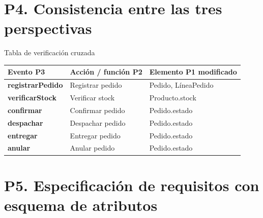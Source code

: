 \documentclass[11pt,a4paper]{article}
\begin{document}
\section*{P4. Consistencia entre las tres perspectivas}
\begin{taskbox}{Tabla de verificación cruzada}
\small
\begin{tabularx}{\textwidth}{>{\bfseries}p{2.8cm} X X}
\toprule
\textcolor{uteqblue}{Evento P3} & \textcolor{uteqblue}{Acción / función P2} & \textcolor{uteqblue}{Elemento P1 modificado} \\
\midrule
registrarPedido & Registrar pedido & Pedido, LíneaPedido \\
verificarStock & Verificar stock & Producto.stock \\
confirmar & Confirmar pedido & Pedido.estado \\
despachar & Despachar pedido & Pedido.estado \\
entregar & Entregar pedido & Pedido.estado \\
anular & Anular pedido & Pedido.estado \\
\bottomrule
\end{tabularx}
\normalsize
\end{taskbox}

\section*{P5. Especificación de requisitos con esquema de atributos}
\end{document}
